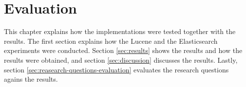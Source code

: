 \chapter{Evaluation}
\label{ch:evaluation}
This chapter explains how the implementations were tested together with the results.
The first section explains how the Lucene and the Elasticsearch experiments were conducted.
Section \ref{sec:results} shows the results and how the results were obtained,
and section \ref{sec:discussion} discusses the results.
Lastly, section \ref{sec:reasearch-questions-evaluation} evaluates the research questions agains the results.





